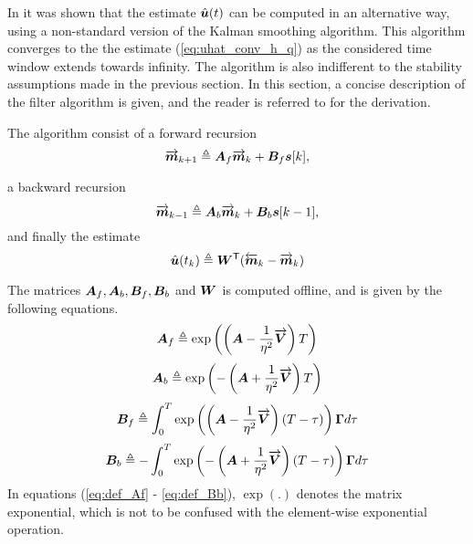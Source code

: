 In \cite{cbc_2011_loeliger} it was shown that the estimate $\hat{\bm{u}}(t)$ can be computed in an alternative way, using a non-standard version of the Kalman smoothing algorithm. This algorithm converges to the the estimate (\ref{eq:uhat_conv_h_q}) as the considered time window extends towards infinity. The algorithm is also indifferent to the stability assumptions made in the previous section. In this section, a concise description of the filter algorithm is given, and the reader is referred to \cite{cbc_2020_loeliger} for the derivation.

The algorithm consist of a forward recursion
\begin{equation}
    \label{eq:mf}
    \overrightarrow{\bm{m}}_{k+1} \triangleq \bm{A}_f \overrightarrow{\bm{m}}_k +  \bm{B}_f\bm{s}[k],
\end{equation}

a backward recursion
\begin{equation}
    \label{eq:mf}
    \overrightarrow{\bm{m}}_{k-1} \triangleq \bm{A}_b \overrightarrow{\bm{m}}_{k} +  \bm{B}_b\bm{s}[k-1],
\end{equation}
and finally the estimate
\begin{equation}
    \label{eq:uhat_filter_estimate}
    \hat{\bm{u}}(t_k) \triangleq \bm{W}^\mathsf{T}(\overleftarrow{\bm{m}}_k - \overrightarrow{\bm{m}}_k)
\end{equation}

The matrices $\bm{A}_f, \bm{A}_b, \bm{B}_f, \bm{B}_b$ and $\bm{W}^\mathsf{}$ is computed offline, and is given by the following equations.
\begin{equation}
    \label{eq:def_Af}
    \bm{A}_f \triangleq \exp \left( \left( \bm{A} - \frac{1}{\eta^2} \overrightarrow{\bm{V}} \right) T \right)
\end{equation}
\begin{equation}
    \label{eq:def_Ab}
    \bm{A}_b \triangleq \exp \left( - \left( \bm{A} + \frac{1}{\eta^2} \overrightarrow{\bm{V}} \right) T \right)
\end{equation}
\begin{equation}
    \label{eq:def_Bf}
    \bm{B}_f \triangleq \int_0^T \exp \left( \left( \bm{A} - \frac{1}{\eta^2} \overrightarrow{\bm{V}} \right) (T-\tau) \right)\bm{\Gamma} d\tau
\end{equation}
\begin{equation}
    \label{eq:def_Bb}
    \bm{B}_b \triangleq -\int_0^T \exp \left( - \left( \bm{A} + \frac{1}{\eta^2} \overrightarrow{\bm{V}} \right) (T-\tau) \right)\bm{\Gamma} d\tau
\end{equation}
In equations (\ref{eq:def_Af} - \ref{eq:def_Bb}), $\exp(.)$ denotes the matrix exponential, which is not to be confused with the element-wise exponential operation.

